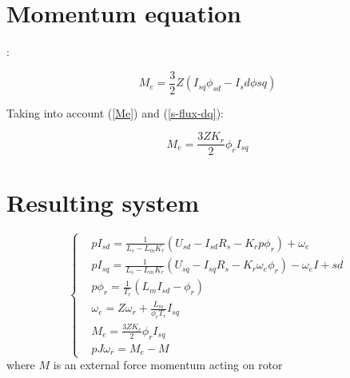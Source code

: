 \documentclass[11pt,a4paper,oneside]{report}
\begin{document}
\section{Momentum equation}:

\begin{equation}
	\label{Me}
	M_e = \frac{3}{2}Z(I_{sq}\phi_{sd} - I_sd\phi{sq})
\end{equation}

Taking into account (\ref{Me}) and (\ref{s-flux-dq}):

\begin{equation}
	M_e = \frac{3ZK_r}{2}\phi_rI_{sq}
\end{equation}

\section{Resulting system}

\begin{equation}
	\left\{
	\begin{split}
		& pI_{sd}=\frac{1}{L_s-L_mK_r}(U_{sd}-I_{sd}R_s-K_rp\phi_r)+\omega_e\\
		& pI_{sq}=\frac{1}{L_s-L_mK_r}(U_{sq}-I_{sq}R_s-K_r\omega_e\phi_r)-\omega_e I+{sd}\\
		& p\phi_r=\frac{1}{T_r}(L_mI_{sd}-\phi_r)\\
		& \omega_e = Z\omega_r+\frac{L_m}{\phi_rT_r}I_{sq}\\
		& M_e=\frac{3ZK_r}{2}\phi_rI_{sq}\\
		& pJ\omega_r = M_e- M
	\end{split}
	\right.
\end{equation}
where $M$ is an external force momentum acting on rotor
\end{document}
